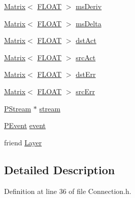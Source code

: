 \begin{DoxyCompactItemize}
\item 
\hyperlink{classfractal_1_1Matrix}{Matrix}$<$ \hyperlink{namespacefractal_a1c2d2530689575d5ccb56bae52af70d3}{F\+L\+O\+A\+T} $>$ \hyperlink{classfractal_1_1Connection_ac4df1add96950e005f005047f25f158d}{ms\+Deriv}
\item 
\hyperlink{classfractal_1_1Matrix}{Matrix}$<$ \hyperlink{namespacefractal_a1c2d2530689575d5ccb56bae52af70d3}{F\+L\+O\+A\+T} $>$ \hyperlink{classfractal_1_1Connection_a0cd41b30d1dc0db0a6722521a20906ea}{ms\+Delta}
\item 
\hyperlink{classfractal_1_1Matrix}{Matrix}$<$ \hyperlink{namespacefractal_a1c2d2530689575d5ccb56bae52af70d3}{F\+L\+O\+A\+T} $>$ \hyperlink{classfractal_1_1Connection_a7e99d505ee81e3c7c00dceb70efdf8bf}{dst\+Act}
\item 
\hyperlink{classfractal_1_1Matrix}{Matrix}$<$ \hyperlink{namespacefractal_a1c2d2530689575d5ccb56bae52af70d3}{F\+L\+O\+A\+T} $>$ \hyperlink{classfractal_1_1Connection_aae995012548c5f535cf4dd16aa8985c5}{src\+Act}
\item 
\hyperlink{classfractal_1_1Matrix}{Matrix}$<$ \hyperlink{namespacefractal_a1c2d2530689575d5ccb56bae52af70d3}{F\+L\+O\+A\+T} $>$ \hyperlink{classfractal_1_1Connection_a2374b05f600966a36a1eec9b0946328d}{dst\+Err}
\item 
\hyperlink{classfractal_1_1Matrix}{Matrix}$<$ \hyperlink{namespacefractal_a1c2d2530689575d5ccb56bae52af70d3}{F\+L\+O\+A\+T} $>$ \hyperlink{classfractal_1_1Connection_abc00863a5dc0e43990ace905ed7f50c0}{src\+Err}
\item 
\hyperlink{classfractal_1_1PStream}{P\+Stream} $\ast$ \hyperlink{classfractal_1_1Connection_afd1476955597e7a1fddb196fec69af82}{stream}
\item 
\hyperlink{classfractal_1_1PEvent}{P\+Event} \hyperlink{classfractal_1_1Connection_a1440177a726771823d046340f1c24e59}{event}
\item 
friend \hyperlink{classfractal_1_1Connection_aee958063517851c72a62c55f049300be}{Layer}
\end{DoxyCompactItemize}


\subsection{Detailed Description}


Definition at line 36 of file Connection.\+h.



